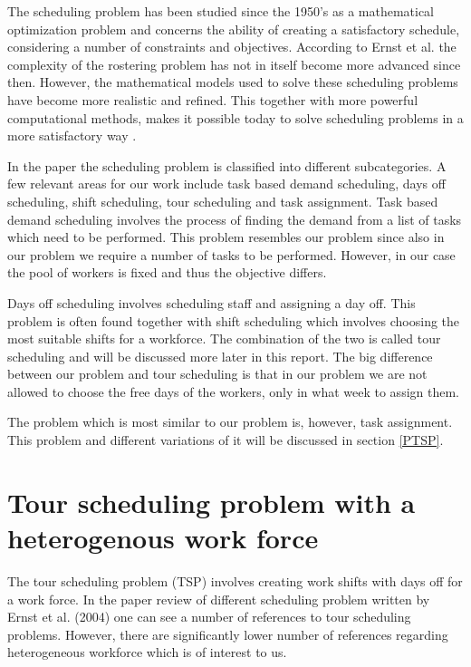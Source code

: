 
The scheduling problem has been studied since the 1950's as a mathematical optimization problem and concerns the ability of creating a satisfactory schedule, considering a number of constraints and objectives. According to Ernst et al. the complexity of the rostering problem has not in itself become more advanced since then. However, the mathematical models used to solve these scheduling problems have become more realistic and refined. This together with more powerful computational methods, makes it possible today to solve scheduling problems in a more satisfactory way \cite{Ernst_2004}.

In the paper \cite{Ernst_2004} the scheduling problem is classified into different subcategories. A few relevant areas for our work include task based demand scheduling, days off scheduling, shift scheduling, tour scheduling and task assignment. Task based demand scheduling involves the process of finding the demand from a list of tasks which need to be performed. This problem resembles our problem since also in our problem we require a number of tasks to be performed. However, in our case the pool of workers is fixed and thus the objective differs. 
	
Days off scheduling involves scheduling staff and assigning a day off. This problem is often found together with shift scheduling which involves choosing the most suitable shifts for a workforce. The combination of the two is called tour scheduling and will be discussed more later in this report. The big difference between our problem and tour scheduling is that in our problem we are not allowed to choose the free days of the workers, only in what week to assign them.

The problem which is most similar to our problem is, however, task assignment. This problem and different variations of it will be discussed in section \ref{PTSP}.

\iffalse
 (The Use of Mathematical Models in Plant Maintenance Decision Making, 1967) In surveys such as "An Annotated Bibliography of Personnel Scheduling
and Rostering" Ernst et al. 2004,  covers papers from 1954. The bibliography covers the most important contributions to the area of scheduling up to the year 2004 and divides the area into different subcategories. Below, we have identified the most relevant areas of scheduling in relation to the problem at hand.
\fi

\section{Tour scheduling problem with a heterogenous work force}\label{TSP}
The tour scheduling problem (TSP) involves creating work shifts with days off for a work force. 
In the paper review of different scheduling problem written by Ernst et al. (2004) one can see a number of references to tour scheduling problems. However, there are significantly lower number of references regarding heterogeneous workforce which is of interest to us.

